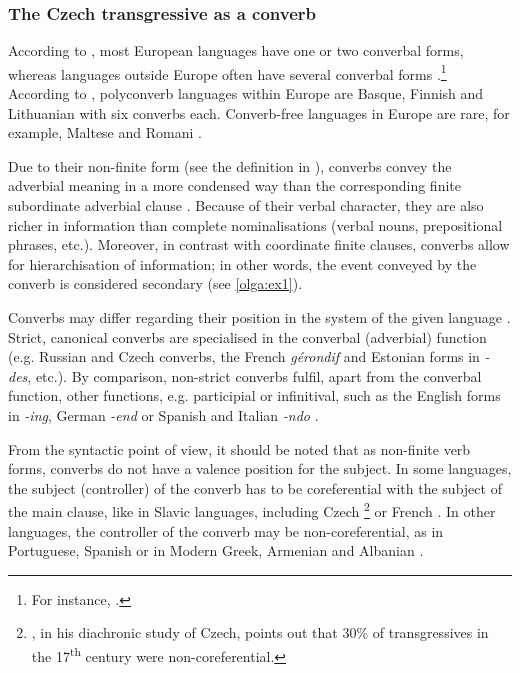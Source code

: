 \documentclass[output=paper,russian]{langsci/langscibook}
\begin{document}
\subsubsection{The Czech transgressive as a converb}\label{olga:cztc}

According to \textcite[431]{nedjalkov98}, most European languages have one or two converbal forms, whereas languages outside Europe often have several converbal forms \parencite[e.g. Japanese, see][]{alppod95}.\footnote{For instance, .} According to \textcite[430]{nedjalkov98}, polyconverb languages within Europe are Basque, Finnish and Lithuanian with six converbs each. Converb-free languages in Europe are rare, for example, Maltese and Romani \parencite{nedjalkov98}.

Due to their non-finite form (see the definition in ), converbs convey the adverbial meaning in a more condensed way than the corresponding finite subordinate adverbial clause \parencites[see][]{vachek55}{nosek64}[for Romance, for instance,][]{ceretal20}[for Czech][]{becka77}. Because of their verbal character, they are also richer in information than complete nominalisations (verbal nouns, prepositional phrases, etc.). Moreover, in contrast with coordinate finite clauses, converbs allow for hierarchisation of information; in other words, the event conveyed by the converb is considered secondary (see \ref{olga:ex1}).

Converbs may differ regarding their position in the system of the given language \parencites[see][104--106]{nedjalkov95}[433]{nedjalkov98}. Strict, canonical converbs are specialised in the converbal (adverbial) function (e.g. Russian and Czech converbs, the French \textit{gérondif} and Estonian forms in \textit{-des}, etc.). By comparison, non-strict converbs fulfil, apart from the converbal function, other functions, e.g. participial or infinitival, such as the English forms in \textit{-ing}, German \textit{-end} or Spanish and Italian \textit{-ndo} \parencites[see][425]{nedjalkov98}[for Romance, see][]{ceretal20}.

From the syntactic point of view, it should be noted that as non-finite verb forms, converbs do not have a valence position for the subject. In some languages, the subject (controller) of the converb has to be coreferential with the subject of the main clause, like in Slavic languages, including Czech \parencites[\textit{same-subject converbs}, see][425]{nedjalkov98}[153]{komarek86}\footnote{\textcite[37--45]{dvorak70}, in his diachronic study of Czech, points out that 30\% of transgressives in the 17\textsuperscript{th} century were non-coreferential.} or French \parencite[\textit{gérondif}, see][1252]{gregoo16}. In other languages, the controller of the converb may be non-coreferential, as in Portuguese, Spanish \parencite[see][111]{ceretal20} or in Modern Greek, Armenian and Albanian \parencite[425]{nedjalkov98}.
\end{document}
